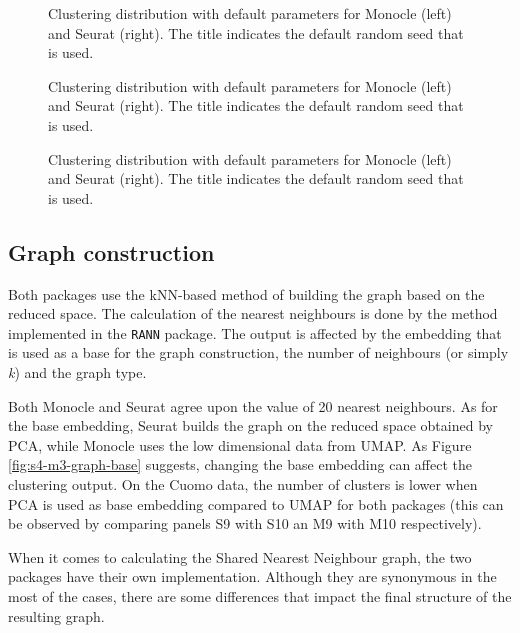 \begin{figure}[H]
    \centering
    \caption{\label{fig:s4-m3-pca}Clustering distribution with default parameters for Monocle (left) and Seurat (right). The title indicates the default random seed that is used.}
\end{figure}


\begin{figure}[H]
    \centering
    \caption{\label{fig:s4-m3-min-dist}Clustering distribution with default parameters for Monocle (left) and Seurat (right). The title indicates the default random seed that is used.}
\end{figure}

\begin{figure}[H]
    \centering
    \caption{\label{fig:s4-m3-n-neigh-umap}Clustering distribution with default parameters for Monocle (left) and Seurat (right). The title indicates the default random seed that is used.}
\end{figure}

\subsection{Graph construction}
Both packages use the kNN-based method of building the graph based on the reduced space. The calculation of the nearest neighbours is done by the method implemented in the \verb|RANN| package. The output is affected by the embedding that is used as a base for the graph construction, the number of neighbours (or simply \textit{k}) and the graph type.

Both Monocle and Seurat agree upon the value of 20 nearest neighbours. As for the base embedding, Seurat builds the graph on the reduced space obtained by PCA, while Monocle uses the low dimensional data from UMAP. As Figure \ref{fig:s4-m3-graph-base} suggests, changing the base embedding can affect the clustering output. On the Cuomo data, the number of clusters is lower when PCA is used as base embedding compared to UMAP for both packages (this can be observed by comparing panels S9 with S10 an M9 with M10 respectively).

When it comes to calculating the Shared Nearest Neighbour graph, the two packages have their own implementation. Although they are synonymous in the most of the cases, there are some differences that impact the final structure of the resulting graph.

